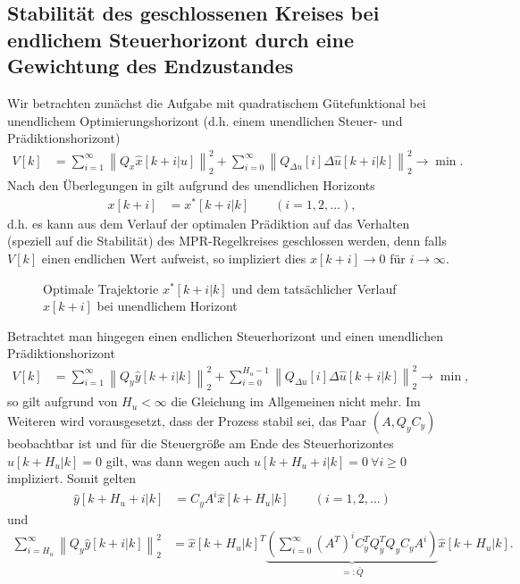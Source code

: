 \subsection{Stabilität des geschlossenen Kreises bei endlichem Steuerhorizont durch eine Gewichtung des Endzustandes}
Wir betrachten zunächst die Aufgabe mit quadratischem Gütefunktional bei unendlichem Optimierungshorizont (d.h. einem unendlichen Steuer- und Prädiktionshorizont)
\begin{align}
	V[k] & = \sum\limits_{i=1}^{\infty}\left\| Q_x\hat{x}[k+i|u] \right\|_2^2 + \sum\limits_{i=0}^{\infty}\left\|Q_{\Delta u}[i]\Delta\hat{u}[k+i|k]
	\right\|_2^2\rightarrow \min .
\end{align}
Nach den Überlegungen in  gilt aufgrund des unendlichen Horizonts
\begin{align}
	x[k+i] & = x^{\ast}[k+i|k]\qquad (i=1,2,\ldots),\label{eqn:kap_4_x_normal_geschaetzt}
\end{align}
d.h. es kann aus dem Verlauf der optimalen Prädiktion auf das Verhalten (speziell auf die Stabilität) des \ac{MPR}-Regelkreises geschlossen werden, denn falls $V[k]$ einen endlichen
Wert aufweist, so impliziert dies $x[k+i]\rightarrow 0$ für $i\rightarrow\infty$.
\begin{figure}[htb]
	\centering
	
	\caption{Optimale Trajektorie $x^{\ast}[k+i|k]$ und dem tatsächlicher Verlauf $x[k+i]$ bei unendlichem Horizont}
	\label{fig:kap_4_abweichung_opt_tatsaechlich_verlauf_unendl}
\end{figure}
Betrachtet man hingegen einen endlichen Steuerhorizont und einen unendlichen Prädiktionshorizont
\begin{align}
	V[k] & = \sum\limits_{i=1}^{\infty}\left\| Q_y\hat{y}[k+i|k] \right\|_2^2 + \sum\limits_{i=0}^{H_u-1}\left\| Q_{\Delta u}[i]\Delta
	\hat{u}[k+i|k]\right\|_2^2\rightarrow\min,
\end{align}
so gilt aufgrund von $H_u<\infty$ die Gleichung  im Allgemeinen nicht mehr. Im Weiteren wird vorausgesetzt, dass der Prozess stabil sei, das Paar
$(A,Q_yC_y)$ beobachtbar ist und für die Steuergröße am Ende des Steuerhorizontes $\hat{u}[k+H_u|k]=0$ gilt, was dann wegen  auch
$\hat{u}[k+H_u+i|k]=0\ \forall i\ge 0$ impliziert. Somit gelten
\begin{align*}
	\hat{y}[k+H_u+i|k] & =  C_yA^i\hat{x}[k+H_u|k]\qquad (i=1,2,\ldots)
\end{align*}
und
\begin{align*}
	\sum\limits_{i=H_u}^{\infty}\left\| Q_y\hat{y}[k+i|k]\right\|_2^2 & = \hat{x}[k+H_u|k]^T\underbrace{ \left(\sum\limits_{i=0}^{\infty}\left(A^T\right)^iC_y^TQ_y^TQ_yC_yA^i\right)
	}_{=:\bar{Q}}\hat{x}[k+H_u|k].
\end{align*}
